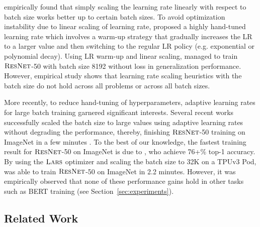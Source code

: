 \documentclass{article} \usepackage{iclr2020_conference,times}
\newcommand{\resnet}{\textsc{ResNet}}
\newcommand{\lars}{\textsc{Lars}}
\begin{document}
\citep{krizhevsky2014one} empirically found that simply scaling the learning rate linearly with respect to batch size works better up to certain batch sizes. To avoid optimization instability due to linear scaling of learning rate, \citet{goyal2017accurate} proposed a highly hand-tuned learning rate which involves a warm-up strategy that gradually increases the LR to a larger value and then switching to the regular LR policy (e.g. exponential or polynomial decay). Using LR warm-up and linear scaling, \citet{goyal2017accurate} managed to train $\resnet$-50 with batch size 8192 without loss in generalization performance. However, empirical study \citep{shallue2018measuring} shows that learning rate scaling heuristics with the batch size do not hold across all problems or across all batch sizes.

More recently, to reduce hand-tuning of hyperparameters, adaptive learning rates for large batch training garnered significant interests. Several recent works successfully scaled the batch size to large values using adaptive learning rates without degrading the performance, thereby, finishing $\resnet$-50 training on ImageNet in a few minutes \citep{you2018imagenet,iandola2016firecaffe,codreanu2017scale,akiba2017extremely,jia2018highly,smith2017don,martens2015optimizing,devarakonda2017adabatch,mikami2018imagenet,osawa2018second,you2019large,yamazaki2019yet}.
To the best of our knowledge, the fastest training result for $\resnet$-50 on ImageNet is due to \cite{ying2018image}, who achieve 76+\% top-1 accuracy. By using the $\lars$ optimizer and scaling the batch size to 32K  on a TPUv3 Pod, \citet{ying2018image} was able to train $\resnet$-50 on ImageNet in 2.2 minutes. However, it was empirically observed that none of these performance gains hold in other tasks such as BERT training (see Section~\ref{sec:experiments}).  


\iffalse
\subsection{Related Work}
\end{document}

